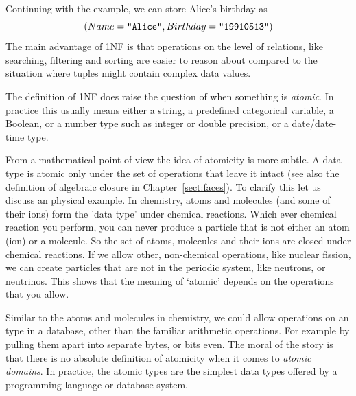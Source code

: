 Continuing with the example, we can store Alice's birthday as
$$
(Name =\texttt{"Alice"}, Birthday = \texttt{"19910513"} )
$$
The main advantage of 1NF is that operations on the level of relations, like
searching, filtering and sorting are easier to reason about compared to the
situation where tuples might contain complex data values.


The definition of 1NF does raise the question of when something is
\emph{atomic}.  In practice this usually means either a string, a predefined
categorical variable, a Boolean, or a number type such as integer or double
precision, or a date/date-time type.

From a mathematical point of view the idea of atomicity is more subtle. A data
type is atomic only under the set of operations that leave it intact (see also
the definition of algebraic closure in Chapter~\ref{sect:faces}). To clarify
this let us discuss an physical example. In chemistry, atoms and molecules (and
some of their ions) form the 'data type' under chemical reactions.  Which ever
chemical reaction you perform, you can never produce a particle that is not
either an atom (ion) or a molecule. So the set of atoms, molecules and their
ions are closed under chemical reactions. If we allow other, non-chemical
operations, like nuclear fission, we can create particles that are not in the
periodic system, like neutrons, or neutrinos. This shows that the meaning of
`atomic' depends on the operations that you allow. 

Similar to the atoms and molecules in chemistry, we could allow operations on
an  type in a database, other than the familiar arithmetic
operations. For example by pulling them apart into separate bytes, or bits
even. The moral of the story is that there is no absolute definition of
atomicity when it comes to \emph{atomic domains}. In practice, the atomic types
are the simplest data types offered by a programming language or database
system.


